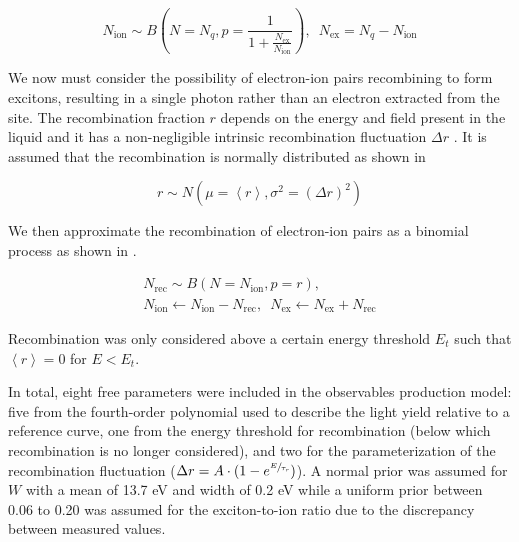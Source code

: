 \begin{equation}
        \label{eqn:xe1t_er_exciton_ion}
        N_{\textrm{ion}} \sim B \left( N=N_q, p = \frac{1}{1 + \frac{N_{\textrm{ex}}}{N_{\textrm{ion}}}} \right) , \, \, \, N_{\textrm{ex}} = N_q - N_{\textrm{ion}}
\end{equation}


We now must consider the possibility of electron-ion pairs recombining to form excitons, resulting in a single photon rather than an electron extracted from the site.  The recombination fraction $r$ depends on the energy and field present in the liquid and it has a non-negligible intrinsic recombination fluctuation $\Delta r$ \cite{akerib2016tritium, aprile2017tritium}.  It is assumed that the recombination is normally distributed as shown in 

\begin{equation}
        \label{eqn:xe1t_recombination_fluc}
        r \sim N(\mu = \left< r \right>, \sigma^2 = (\Delta r)^2)
\end{equation}

We then approximate the recombination of electron-ion pairs as a binomial process as shown in .

\begin{equation}
        \label{eqn:xe1t_recombination}
        \begin{gathered}
                N_{\textrm{rec}} \sim B(N = N_{\textrm{ion}}, p = r), \\ 
                N_{\textrm{ion}} \leftarrow N_{\textrm{ion}} - N_{\textrm{rec}}, \, \, \,  N_{\textrm{ex}} \leftarrow N_{\textrm{ex}} + N_{\textrm{rec}}
        \end{gathered}
\end{equation}


Recombination was only considered above a certain energy threshold $E_t$ such that $\left< r \right> = 0$ for $E < E_t$.  

In total, eight free parameters were included in the observables production model: five from the fourth-order polynomial used to describe the light yield relative to a reference curve, one from the energy threshold for recombination (below which recombination is no longer considered), and two for the parameterization of the recombination fluctuation ($\Delta r = A \cdot (1 - e^{\sfrac{E}{\tau_r}})$).  A normal prior was assumed for $W$ with a mean of 13.7 eV and width of 0.2 eV while a uniform prior between 0.06 to 0.20 \cite{takahashi1975average, aprile2007observation} was assumed for the exciton-to-ion ratio due to the discrepancy between measured values.  

